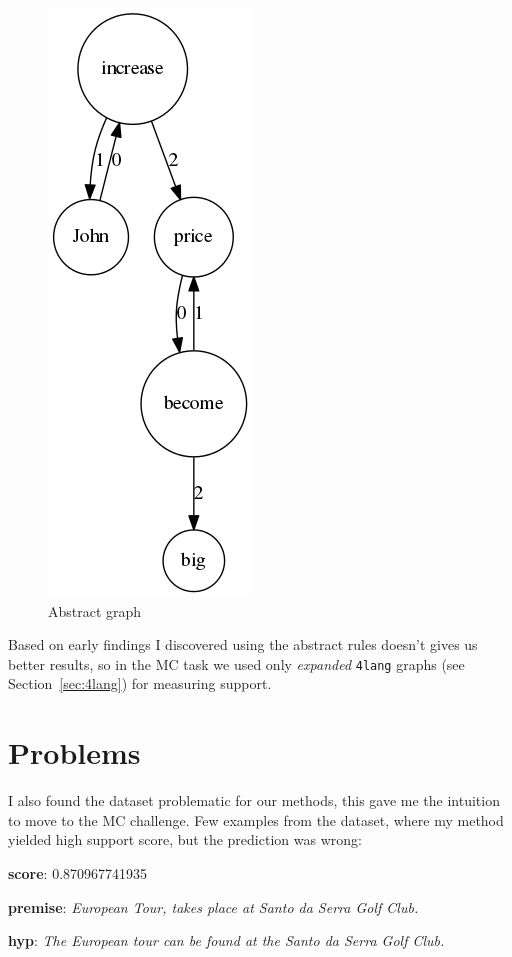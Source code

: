 \begin{figure}
	\centering
	\includegraphics[scale=0.5]{figures/thirdrule3}
	\caption{Abstract graph}
	\label{fig:thirdrule3}
\end{figure}

Based on early findings I discovered using the abstract rules doesn't gives us better results, so in the MC task we used only \textit{expanded} \texttt{4lang} graphs (see
Section~\ref{sec:4lang}) for measuring support. 

\section{Problems}
I also found the dataset problematic for our methods, this gave me the intuition to move to the MC challenge. Few examples from the dataset, where my method yielded high support score, but the prediction was wrong:

\textbf{score}: 0.870967741935

\textbf{premise}: \textit{European Tour, takes place at Santo da Serra Golf Club.}

\textbf{hyp}: \textit{The European tour can be found at the Santo da Serra Golf Club.}
\newline

